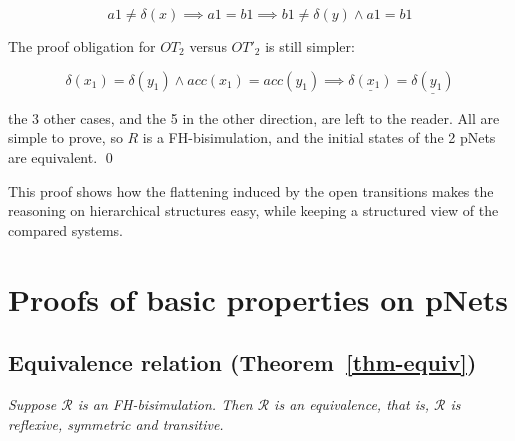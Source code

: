 \documentclass{lncs/llncs}
\begin{document}
    $$  a1\neq\delta(x) \implies
         a1=b1 \implies b1\neq\delta(y) \land a1=b1 $$

    The proof obligation for $OT_2$ versus $OT'_2$ is still simpler:

    $$ \delta(x_1)=\delta(y_1) \land acc(x_1)=acc(y_1)
       \implies \underline{\delta(x_1)}=\underline{\delta(y_1)} $$

       the 3 other cases, and the 5 in the other direction, are left
       to the reader. All are simple to prove, so $R$ is a
       FH-bisimulation, and the initial states of the 2 pNets are equivalent.
           \qed
       
       This proof shows how the flattening induced by the open transitions makes the 
       reasoning on hierarchical structures easy, while keeping a structured view of the 
       compared systems.

       
       \newpage
       
       \section{Proofs of basic properties on pNets}
       \subsection{Equivalence relation (Theorem~\ref{thm-equiv})}
        \emph{Suppose $\mathcal{R}$ 
       	is an FH-bisimulation. Then $\mathcal{R}$ is an equivalence, that is, 
       	$\mathcal{R}$ is 
       	reflexive, symmetric and transitive.
       	}
       
\end{document}
